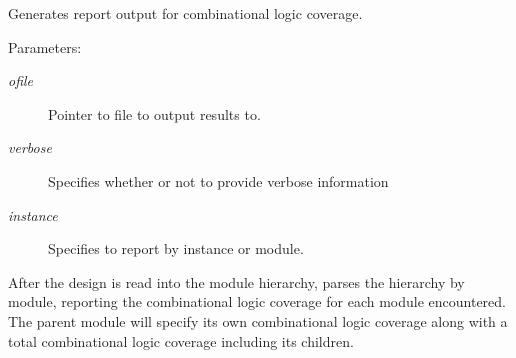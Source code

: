 Generates report output for combinational logic coverage.

\begin{Desc}
\item[Parameters: ]\par
\begin{description}
\item[{\em 
ofile}]Pointer to file to output results to. \item[{\em 
verbose}]Specifies whether or not to provide verbose information \item[{\em 
instance}]Specifies to report by instance or module.\end{description}
\end{Desc}
After the design is read into the module hierarchy, parses the hierarchy by module, reporting the combinational logic coverage for each module encountered. The parent  module will specify its own combinational logic coverage along with a total combinational logic coverage including its children. 